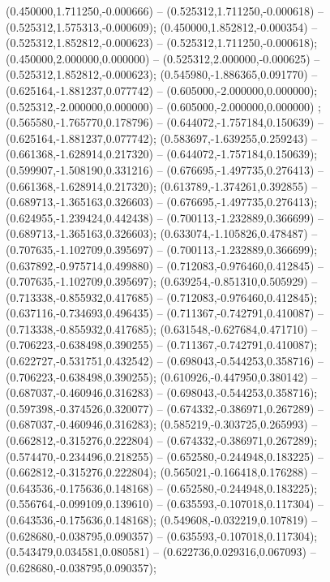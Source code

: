  (0.450000,1.711250,-0.000666) -- (0.525312,1.711250,-0.000618) -- (0.525312,1.575313,-0.000609);
 (0.450000,1.852812,-0.000354) -- (0.525312,1.852812,-0.000623) -- (0.525312,1.711250,-0.000618);
 (0.450000,2.000000,0.000000) -- (0.525312,2.000000,-0.000625) -- (0.525312,1.852812,-0.000623);
 (0.545980,-1.886365,0.091770) -- (0.625164,-1.881237,0.077742) -- (0.605000,-2.000000,0.000000);
 (0.525312,-2.000000,0.000000) -- (0.605000,-2.000000,0.000000) ;
 (0.565580,-1.765770,0.178796) -- (0.644072,-1.757184,0.150639) -- (0.625164,-1.881237,0.077742);
 (0.583697,-1.639255,0.259243) -- (0.661368,-1.628914,0.217320) -- (0.644072,-1.757184,0.150639);
 (0.599907,-1.508190,0.331216) -- (0.676695,-1.497735,0.276413) -- (0.661368,-1.628914,0.217320);
 (0.613789,-1.374261,0.392855) -- (0.689713,-1.365163,0.326603) -- (0.676695,-1.497735,0.276413);
 (0.624955,-1.239424,0.442438) -- (0.700113,-1.232889,0.366699) -- (0.689713,-1.365163,0.326603);
 (0.633074,-1.105826,0.478487) -- (0.707635,-1.102709,0.395697) -- (0.700113,-1.232889,0.366699);
 (0.637892,-0.975714,0.499880) -- (0.712083,-0.976460,0.412845) -- (0.707635,-1.102709,0.395697);
 (0.639254,-0.851310,0.505929) -- (0.713338,-0.855932,0.417685) -- (0.712083,-0.976460,0.412845);
 (0.637116,-0.734693,0.496435) -- (0.711367,-0.742791,0.410087) -- (0.713338,-0.855932,0.417685);
 (0.631548,-0.627684,0.471710) -- (0.706223,-0.638498,0.390255) -- (0.711367,-0.742791,0.410087);
 (0.622727,-0.531751,0.432542) -- (0.698043,-0.544253,0.358716) -- (0.706223,-0.638498,0.390255);
 (0.610926,-0.447950,0.380142) -- (0.687037,-0.460946,0.316283) -- (0.698043,-0.544253,0.358716);
 (0.597398,-0.374526,0.320077) -- (0.674332,-0.386971,0.267289) -- (0.687037,-0.460946,0.316283);
 (0.585219,-0.303725,0.265993) -- (0.662812,-0.315276,0.222804) -- (0.674332,-0.386971,0.267289);
 (0.574470,-0.234496,0.218255) -- (0.652580,-0.244948,0.183225) -- (0.662812,-0.315276,0.222804);
 (0.565021,-0.166418,0.176288) -- (0.643536,-0.175636,0.148168) -- (0.652580,-0.244948,0.183225);
 (0.556764,-0.099109,0.139610) -- (0.635593,-0.107018,0.117304) -- (0.643536,-0.175636,0.148168);
 (0.549608,-0.032219,0.107819) -- (0.628680,-0.038795,0.090357) -- (0.635593,-0.107018,0.117304);
 (0.543479,0.034581,0.080581) -- (0.622736,0.029316,0.067093) -- (0.628680,-0.038795,0.090357);
